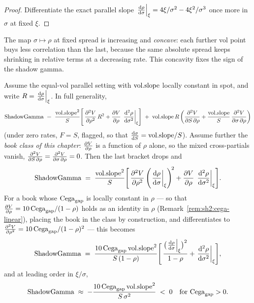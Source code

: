 \begin{proof}
Differentiate the exact parallel slope
$\left.\frac{\mathrm{d} \rho}{\mathrm{d} \sigma}\right|_{\xi} = 4\xi/\sigma^2 - 4\xi^2/\sigma^3$
once more in $\sigma$ at fixed $\xi$.
\end{proof}

The map $\sigma \mapsto \rho$ at fixed spread is increasing and
\emph{concave}: each further vol point buys less correlation than the last,
because the same absolute spread keeps shrinking in relative terms at a
decreasing rate. This concavity fixes the sign of the shadow gamma.

\begin{proposition}\label{prop:sh2:shadow-gamma}
Assume the equal-vol parallel setting with $\mathrm{vol.slope}$ locally constant in
spot, and write $R = \left.\frac{\mathrm{d} \rho}{\mathrm{d} \sigma}\right|_{\xi}$. In full
generality,
\begin{equation}\label{eq:sh2:shadow-gamma-full}
  \mathrm{ShadowGamma}
  \;=\; \frac{\mathrm{vol.slope}^2}{S}
  \Biggl[\, \frac{\partial^2 V}{\partial \rho^2}\, R^2
        + \frac{\partial V}{\partial \rho}\, \left.\frac{\mathrm{d}^2 \rho}{\mathrm{d} \sigma^2}\right|_{\xi}
  \Biggr]
  \;+\; \mathrm{vol.slope}\, R \left( \frac{\partial^2 V}{\partial S\,\partial \rho}
        + \frac{\mathrm{vol.slope}}{S}\, \frac{\partial^2 V}{\partial \sigma\,\partial \rho} \right)
\end{equation}
(under zero rates, $F = S$, flagged, so that
$\frac{\mathrm{d} \sigma}{\mathrm{d} S} = \mathrm{vol.slope} / S$). Assume further the \emph{book class of
this chapter}: $\frac{\partial V}{\partial \rho}$ is a function of $\rho$ alone, so the mixed
cross-partials vanish,
$\frac{\partial^2 V}{\partial S\,\partial \rho} = \frac{\partial^2 V}{\partial \sigma\,\partial \rho} = 0$. Then the last bracket
drops and
\begin{equation}\label{eq:sh2:shadow-gamma-general}
  \mathrm{ShadowGamma}
  \;=\; \frac{\mathrm{vol.slope}^2}{S}
  \Biggl[\, \frac{\partial^2 V}{\partial \rho^2} \left(\left.\frac{\mathrm{d} \rho}{\mathrm{d} \sigma}\right|_{\xi}\right)^{\!2}
        + \frac{\partial V}{\partial \rho}\, \left.\frac{\mathrm{d}^2 \rho}{\mathrm{d} \sigma^2}\right|_{\xi}
  \Biggr].
\end{equation}
For a book whose $\mathrm{Cega}_{\mathrm{gap}}$ is locally
constant in $\rho$ --- so that
$\frac{\partial V}{\partial \rho} = 10\,\mathrm{Cega}_{\mathrm{gap}}/(1 - \rho)$ holds as an identity in $\rho$
(Remark~\ref{rem:sh2:cega-linear}), placing the book in the class by
construction, and differentiates to
$\frac{\partial^2 V}{\partial \rho^2} = 10\,\mathrm{Cega}_{\mathrm{gap}}/(1 - \rho)^2$ --- this becomes
\begin{equation}\label{eq:sh2:shadow-gamma-cega}
  \mathrm{ShadowGamma}
  \;=\; \frac{10\, \mathrm{Cega}_{\mathrm{gap}}\, \mathrm{vol.slope}^2}{S\,(1 - \rho)}
  \Biggl[\, \frac{\bigl(\left.\frac{\mathrm{d} \rho}{\mathrm{d} \sigma}\right|_{\xi}\bigr)^2}{1 - \rho}
        + \left.\frac{\mathrm{d}^2 \rho}{\mathrm{d} \sigma^2}\right|_{\xi}
  \Biggr],
\end{equation}
and at leading order in $\xi/\sigma$,
\begin{equation}\label{eq:sh2:shadow-gamma-shortcut}
  \mathrm{ShadowGamma}
  \;\approx\; -\frac{10\, \mathrm{Cega}_{\mathrm{gap}}\, \mathrm{vol.slope}^2}{S\, \sigma^2}
  \;<\; 0 \quad \text{for } \mathrm{Cega}_{\mathrm{gap}} > 0 .
\end{equation}
\end{proposition}


